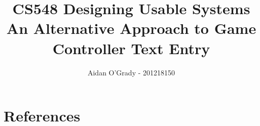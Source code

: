 \documentclass[11pt, a4paper]{article}
\begin{document}
\title{CS548 Designing Usable Systems\\
\large{An Alternative Approach to Game Controller Text Entry}}
\author{Aidan O'Grady - 201218150}
\date{}
\maketitle
\tableofcontents
\newpage





\newpage














\newpage
\appendix
\section{References} %
\label{sec:references}
\printbibliography[heading=none]
\newpage

\end{document}
